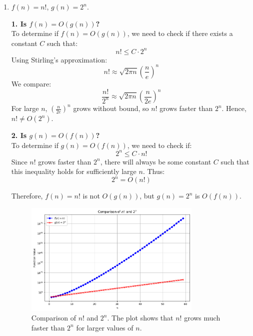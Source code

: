 \documentclass[letter]{article}
\theoremstyle{definition}
\newenvironment{soln}{
	\leavevmode\color{black}\ignorespaces
}{}
\begin{document}
\begin{enumerate}
		
		\item 	$f(n) = n!$, $g(n) = 2^n$.\\
		\begin{soln}
            
            \textbf{1. Is $f(n) = O(g(n))$?}\\
            To determine if $f(n) = O(g(n))$, we need to check if there exists a constant $C$                                   such that:
            \[
            n! \leq C \cdot 2^n
            \]
            Using Stirling's approximation:
            \[
            n! \approx \sqrt{2 \pi n} \left(\frac{n}{e}\right)^n
            \]
            We compare:
            \[
            \frac{n!}{2^n} \approx \sqrt{2 \pi n} \left(\frac{n}{2e}\right)^n
            \]
            For large $n$, $\left(\frac{n}{2e}\right)^n$ grows without bound, so $n!$ grows faster than $2^n$. Hence, $n! \neq O(2^n)$.
            
            \textbf{2. Is $g(n) = O(f(n))$?}\\
            To determine if $g(n) = O(f(n))$, we need to check if:
            \[
            2^n \leq C \cdot n!
            \]
            Since $n!$ grows faster than $2^n$, there will always be some constant $C$ such that this inequality holds for sufficiently large $n$. Thus:
            \[
            2^n = O(n!)
            \]
            
            Therefore, $f(n) = n!$ is not $O(g(n))$, but $g(n) = 2^n$ is $O(f(n))$.
            \end{soln}


            \begin{figure}[H]
                \centering
                \includegraphics[width=0.8\textwidth]{big-o-3.png} %
                \caption{Comparison of $n!$ and $2^n$. The plot shows that $n!$ grows much faster than $2^n$ for larger values of $n$.}
                \label{fig:factorial_vs_exponential}
            \end{figure}

	\end{enumerate}
	
\end{document}
